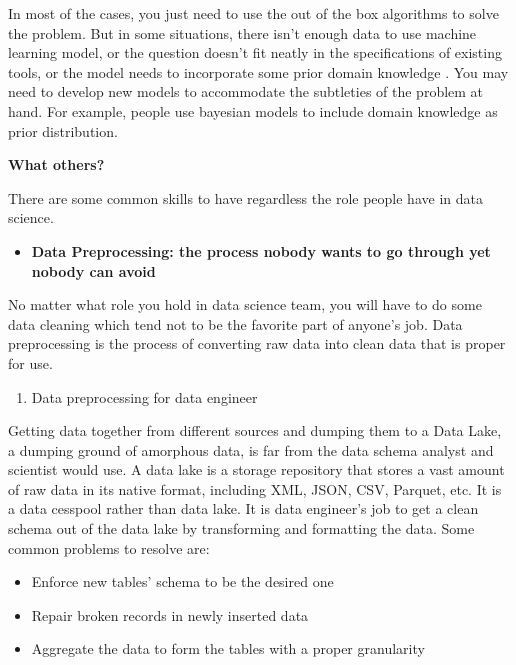 \documentclass[12pt,]{krantz}
\providecommand{\tightlist}{%
  \setlength{\itemsep}{0pt}\setlength{\parskip}{0pt}}
\theoremstyle{definition}
\theoremstyle{definition}
\theoremstyle{definition}
\theoremstyle{remark}
\begin{document}
In most of the cases, you just need to use the out of the box algorithms
to solve the problem. But in some situations, there isn't enough data to
use machine learning model, or the question doesn't fit neatly in the
specifications of existing tools, or the model needs to incorporate some
prior domain knowledge . You may need to develop new models to
accommodate the subtleties of the problem at hand. For example, people
use bayesian models to include domain knowledge as prior distribution.

\textbf{What others?}

There are some common skills to have regardless the role people have in
data science.

\begin{itemize}
\tightlist
\item
  \textbf{Data Preprocessing: the process nobody wants to go through yet
  nobody can avoid}
\end{itemize}

No matter what role you hold in data science team, you will have to do
some data cleaning which tend not to be the favorite part of anyone's
job. Data preprocessing is the process of converting raw data into clean
data that is proper for use.

\begin{enumerate}
\def\labelenumi{(\arabic{enumi})}
\tightlist
\item
  Data preprocessing for data engineer
\end{enumerate}

Getting data together from different sources and dumping them to a Data
Lake, a dumping ground of amorphous data, is far from the data schema
analyst and scientist would use. A data lake is a storage repository
that stores a vast amount of raw data in its native format, including
XML, JSON, CSV, Parquet, etc. It is a data cesspool rather than data
lake. It is data engineer's job to get a clean schema out of the data
lake by transforming and formatting the data. Some common problems to
resolve are:

\begin{itemize}
\tightlist
\item
  Enforce new tables' schema to be the desired one
\item
  Repair broken records in newly inserted data
\item
  Aggregate the data to form the tables with a proper granularity
\end{itemize}
\end{document}
